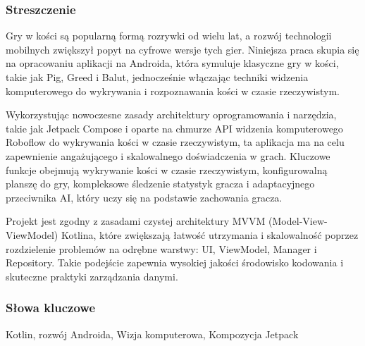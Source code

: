 \subsubsection*{Streszczenie} 
\begin{otherlanguage}{polish}
Gry w kości są popularną formą rozrywki od wielu lat, a rozwój technologii mobilnych zwiększył popyt na cyfrowe wersje tych gier. Niniejsza praca skupia się na opracowaniu aplikacji na Androida, która symuluje klasyczne gry w kości, takie jak Pig, Greed i Balut, jednocześnie włączając techniki widzenia komputerowego do wykrywania i rozpoznawania kości w czasie rzeczywistym.

Wykorzystując nowoczesne zasady architektury oprogramowania i narzędzia, takie jak Jetpack Compose i oparte na chmurze API widzenia komputerowego Roboflow do wykrywania kości w czasie rzeczywistym, ta aplikacja ma na celu zapewnienie angażującego i skalowalnego doświadczenia w grach. Kluczowe funkcje obejmują wykrywanie kości w czasie rzeczywistym, konfigurowalną planszę do gry, kompleksowe śledzenie statystyk gracza i adaptacyjnego przeciwnika AI, który uczy się na podstawie zachowania gracza.
    
Projekt jest zgodny z zasadami czystej architektury MVVM (Model-View-ViewModel) Kotlina, które zwiększają łatwość utrzymania i skalowalność poprzez rozdzielenie problemów na odrębne warstwy: UI, ViewModel, Manager i Repository. Takie podejście zapewnia wysokiej jakości środowisko kodowania i skuteczne praktyki zarządzania danymi.
\end{otherlanguage}

\subsubsection*{Słowa kluczowe} 
\begin{otherlanguage}{polish}
Kotlin, rozwój Androida, Wizja komputerowa, Kompozycja Jetpack
\end{otherlanguage}

